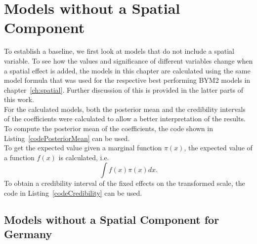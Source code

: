\section{Models without a Spatial Component}
To establish a baseline, we first look at models that do not include a spatial variable. To see how the values and significance of different variables change when a spatial effect is added, the models in this chapter are calculated using the same model formula that was used for the respective best performing BYM2 models in chapter~\ref{ch:spatial}. Further discussion of this is provided in the latter parts of this work. \\
For the calculated models, both the posterior mean and the credibility intervals of the coefficients were calculated to allow a better interpretation of the results. \\
To compute the posterior mean of the coefficients, the code shown in Listing~\ref{codePosteriorMean} can be used. \\
To get the expected value given a marginal function $\pi\left(x\right)$, the expected value of a function $f\left(x\right)$ is calculated, i.e.
\begin{equation*}
    \int f\left(x\right)\pi\left(x\right)dx.
\end{equation*}
To obtain a credibility interval of the fixed effects on the transformed scale, the code in Listing~\ref{codeCredibility} can be used. \\
\subsection{Models without a Spatial Component for Germany}
